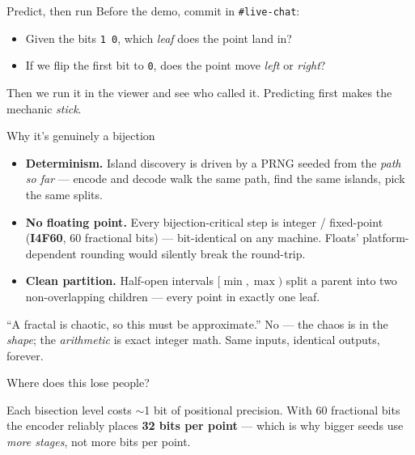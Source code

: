 \documentclass[aspectratio=169,11pt]{beamer}
\begin{document}
\begin{frame}{Predict, then run}
  Before the demo, commit in \texttt{\#live-chat}:
  \begin{itemize}
    \item Given the bits \texttt{1 0}, which \emph{leaf} does the point land in?
    \item If we flip the first bit to \texttt{0}, does the point move
      \emph{left} or \emph{right}?
  \end{itemize}
  \vspace{6pt}
  \begin{center}\small
  Then we run it in the viewer and see who called it. Predicting first makes the
  mechanic \emph{stick}.
  \end{center}
\end{frame}

\begin{frame}{Why it's genuinely a bijection}
  \begin{itemize}\small
    \item \textbf{Determinism.} Island discovery is driven by a PRNG seeded from
      the \emph{path so far} --- encode and decode walk the same path, find the
      same islands, pick the same splits.
    \item \textbf{No floating point.} Every bijection-critical step is
      integer / fixed-point (\textbf{I4F60}, 60 fractional bits) --- bit-identical
      on any machine. Floats' platform-dependent rounding would silently break the
      round-trip.
    \item \textbf{Clean partition.} Half-open intervals $[\min,\max)$ split a
      parent into two non-overlapping children --- every point in exactly one leaf.
  \end{itemize}
  \begin{pitfall}
    ``A fractal is chaotic, so this must be approximate.'' No --- the chaos is in
    the \emph{shape}; the \emph{arithmetic} is exact integer math. Same inputs,
    identical outputs, forever.
  \end{pitfall}
\end{frame}

\begin{frame}{Where does this lose people?}
  \vspace{6pt}
  \begin{deeper}
    Each bisection level costs $\sim$1 bit of positional precision. With 60
    fractional bits the encoder reliably places \textbf{32 bits per point} ---
    which is why bigger seeds use \emph{more stages}, not more bits per point.
  \end{deeper}
\end{frame}
\end{document}
